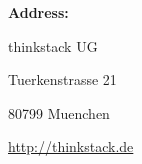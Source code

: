 \documentclass[fleqn,10pt]{SelfArx} %
\begin{document}
\textbf{Address:}

thinkstack UG

Tuerkenstrasse 21

80799 Muenchen

\url{http://thinkstack.de}


%

\end{document}
